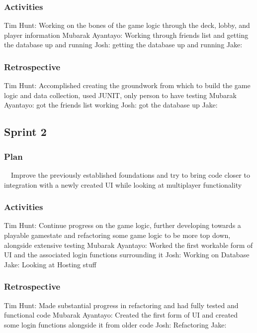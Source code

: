 \documentclass[12pt]{article}
\begin{document}
\subsubsection{Activities}
Tim Hunt: Working on the bones of the game logic through the deck, lobby, and player information \newline
Mubarak Ayantayo: Working through friends list and getting the database up and running \newline
Josh: getting the database up and running \newline
Jake:
\subsubsection{Retrospective}
Tim Hunt: Accomplished creating the groundwork from which to build the game logic and data collection, used JUNIT, only person to have testing \newline
Mubarak Ayantayo: got the friends list working \newline
Josh: got the database up \newline
Jake: 
\subsection{Sprint 2}
\subsubsection{Plan}
\ \ Improve the previously established foundations and try to bring code closer to integration with a newly created UI while looking at multiplayer functionality
\subsubsection{Activities}
Tim Hunt: Continue progress on the game logic, further developing towards a playable gamestate and refactoring some game logic to be more top down, alongside extensive testing \newline
Mubarak Ayantayo: Worked the first workable form of UI and the associated login functions surrounding it \newline
Josh: Working on Database \newline
Jake: Looking at Hosting stuff \newline 
\subsubsection{Retrospective}
Tim Hunt: Made substantial progress in refactoring and had fully tested and functional code \newline
Mubarak Ayantayo: Created the first form of UI and created some login functions alongside it from older code \newline
Josh: Refactoring \newline
Jake:
\end{document}
